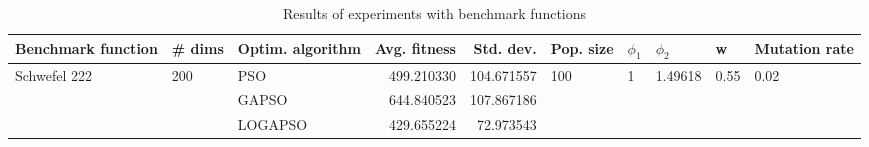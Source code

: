 \begin{table}
\centering
\caption{Results of experiments with benchmark functions}
\begin{tabular}{lllrrlllll}
\toprule
           Benchmark function &              \# dims & Optim. algorithm &  Avg. fitness &  Std. dev. &            Pop. size &         $\phi_{1}$ &               $\phi_{2}$ &                     w &         Mutation rate \\
\midrule
\multirow{3}{*}{Schwefel 222} & \multirow{3}{*}{200} &              PSO &    499.210330 & 104.671557 & \multirow{3}{*}{100} & \multirow{3}{*}{1} & \multirow{3}{*}{1.49618} & \multirow{3}{*}{0.55} & \multirow{3}{*}{0.02} \\
                              &                      &            GAPSO &    644.840523 & 107.867186 &                      &                    &                          &                       &                       \\
                              &                      &          LOGAPSO &    429.655224 &  72.973543 &                      &                    &                          &                       &                       \\
\bottomrule
\end{tabular}
\end{table}

